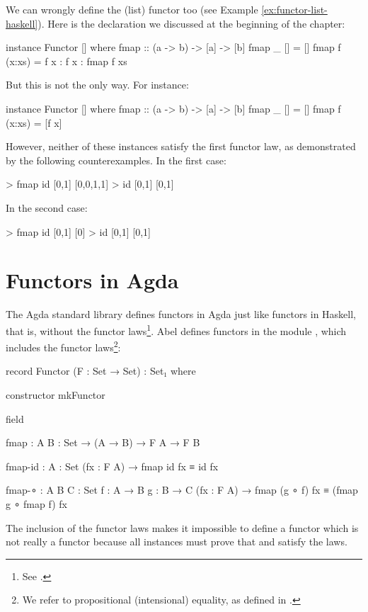 \begin{example}
  \label{ex:functor-bad-list-haskell}

  We can wrongly define the \texthaskell{[]} (list) functor too (see
  Example \ref{ex:functor-list-haskell}). Here is the declaration we
  discussed at the beginning of the chapter:
  \begin{codehaskell}
instance Functor [] where
  fmap :: (a -> b) -> [a] -> [b]
  fmap _ []     = []
  fmap f (x:xs) = f x : f x : fmap f xs
  \end{codehaskell}
  But this is not the only way. For instance:
  \begin{codehaskell}
instance Functor [] where
  fmap :: (a -> b) -> [a] -> [b]
  fmap _ []     = []
  fmap f (x:xs) = [f x]
  \end{codehaskell}
  However, neither of these instances satisfy the first functor law,
  as demonstrated by the following counterexamples. In the first case:
  \begin{codehaskell}
> fmap id [0,1]
[0,0,1,1]
> id [0,1]
[0,1]
  \end{codehaskell}
  In the second case:
  \begin{codehaskell}
> fmap id [0,1]
[0]
> id [0,1]
[0,1]
  \end{codehaskell}

\end{example}

\section{Functors in Agda}
\label{sec:functors-agda}

The Agda standard library defines functors in Agda just like functors
in Haskell, that is, without the functor laws\footnote{See
  \parencite[module ]{danielsson-2013}.}.
Abel defines functors in the module ,
which includes the functor laws\footnote{We refer to propositional
  (intensional) equality, as defined in \parencite[module
    ]{danielsson-2013}.}:
\begin{codeagda}
record Functor (F : Set → Set) : Set₁ where

  constructor mkFunctor

  field

    fmap    : {A B : Set} → (A → B) → F A → F B

    fmap-id : {A : Set} (fx : F A) → fmap id fx ≡ id fx

    fmap-∘  : {A B C : Set} {f : A → B} {g : B → C}
              (fx : F A) → fmap (g ∘ f) fx ≡ (fmap g ∘ fmap f) fx
\end{codeagda}
The inclusion of the functor laws makes it impossible to define a
functor which is not really a functor because all instances must prove
that  and  satisfy the laws.

